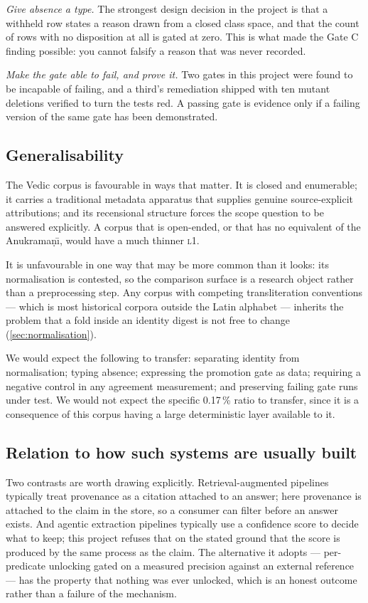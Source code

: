 \emph{Give absence a type.} The strongest design decision in the project is that a
withheld row states a reason drawn from a closed class space, and that the count of
rows with no disposition at all is gated at zero. This is what made the Gate C
finding possible: you cannot falsify a reason that was never recorded.

\emph{Make the gate able to fail, and prove it.} Two gates in this project were
found to be incapable of failing, and a third's remediation shipped with ten mutant
deletions verified to turn the tests red. A passing gate is evidence only if a
failing version of the same gate has been demonstrated.

\subsection{Generalisability}

The Vedic corpus is favourable in ways that matter. It is closed and enumerable;
it carries a traditional metadata apparatus that supplies genuine source-explicit
attributions; and its recensional structure forces the scope question to be answered
explicitly. A corpus that is open-ended, or that has no equivalent of the
Anukrama\d{n}\=\i, would have a much thinner \textsc{l1}.

It is unfavourable in one way that may be more common than it looks: its
normalisation is contested, so the comparison surface is a research object rather
than a preprocessing step. Any corpus with competing transliteration conventions ---
which is most historical corpora outside the Latin alphabet --- inherits the problem
that a fold inside an identity digest is not free to change
(\cref{sec:normalisation}).

We would expect the following to transfer: separating identity from normalisation;
typing absence; expressing the promotion gate as data; requiring a negative control
in any agreement measurement; and preserving failing gate runs under test. We would
not expect the specific 0.17\,\% ratio to transfer, since it is a consequence of this
corpus having a large deterministic layer available to it.

\subsection{Relation to how such systems are usually built}

Two contrasts are worth drawing explicitly. Retrieval-augmented pipelines typically
treat provenance as a citation attached to an answer; here provenance is attached to
the claim in the store, so a consumer can filter before an answer exists. And
agentic extraction pipelines typically use a confidence score to decide what to keep;
this project refuses that on the stated ground that the score is produced by the same
process as the claim. The alternative it adopts --- per-predicate unlocking gated on
a measured precision against an external reference --- has the property that nothing
was ever unlocked, which is an honest outcome rather than a failure of the mechanism.
